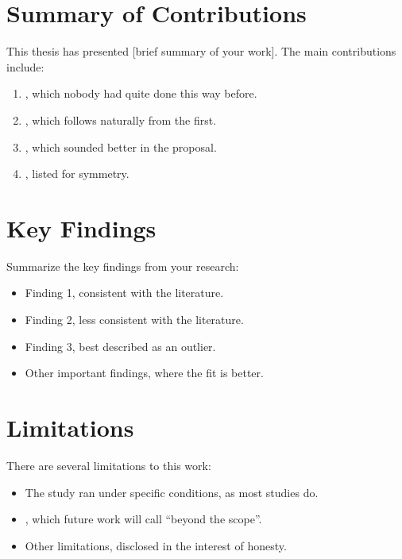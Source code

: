 
\section{Summary of Contributions}

This thesis has presented [brief summary of your work]. The main
contributions include:

\begin{enumerate}
  \item [Contribution 1], which nobody had quite done this way before.
  \item [Contribution 2], which follows naturally from the first.
  \item [Contribution 3], which sounded better in the proposal.
  \item [Additional contributions], listed for symmetry.
\end{enumerate}

\section{Key Findings}

Summarize the key findings from your research:

\begin{itemize}
  \item Finding 1, consistent with the literature.
  \item Finding 2, less consistent with the literature.
  \item Finding 3, best described as an outlier.
  \item Other important findings, where the fit is better.
\end{itemize}

\section{Limitations}

There are several limitations to this work:

\begin{itemize}
  \item The study ran under specific conditions, as most studies do.
  \item [Limitation 2], which future work will call ``beyond the scope''.
  \item Other limitations, disclosed in the interest of honesty.
\end{itemize}

